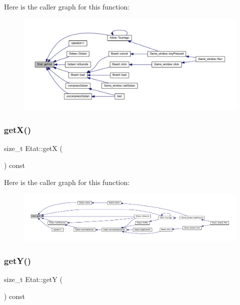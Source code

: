 Here is the caller graph for this function\+:\nopagebreak
\begin{figure}[H]
\begin{center}
\leavevmode
\includegraphics[width=350pt]{class_etat_ac0b81bbcf64cb3cc574e5a9dcdf94382_icgraph}
\end{center}
\end{figure}
\mbox{\label{class_etat_aa25e66b110bc835523819392435e78c6}} 
\subsubsection{\texorpdfstring{get\+X()}{getX()}}
{\footnotesize\ttfamily size\+\_\+t Etat\+::getX (\begin{DoxyParamCaption}{ }\end{DoxyParamCaption}) const}

Here is the caller graph for this function\+:\nopagebreak
\begin{figure}[H]
\begin{center}
\leavevmode
\includegraphics[width=350pt]{class_etat_aa25e66b110bc835523819392435e78c6_icgraph}
\end{center}
\end{figure}
\mbox{\label{class_etat_a3e3e915f2261c83989a983e84b1273c1}} 
\subsubsection{\texorpdfstring{get\+Y()}{getY()}}
{\footnotesize\ttfamily size\+\_\+t Etat\+::getY (\begin{DoxyParamCaption}{ }\end{DoxyParamCaption}) const}

